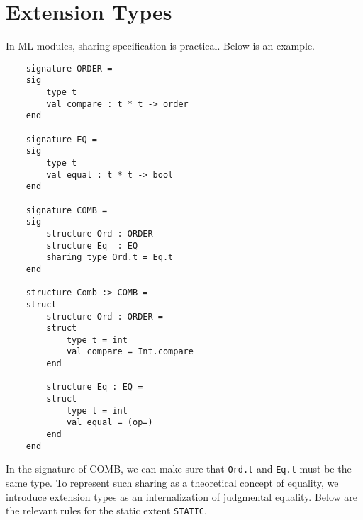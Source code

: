 \documentclass[11pt]{article}
\begin{document}
\section*{Extension Types}
In ML modules, sharing specification is practical. Below is an example.
\begin{verbatim}
    signature ORDER =
    sig
        type t
        val compare : t * t -> order
    end

    signature EQ =
    sig
        type t
        val equal : t * t -> bool
    end

    signature COMB =
    sig
        structure Ord : ORDER
        structure Eq  : EQ
        sharing type Ord.t = Eq.t
    end

    structure Comb :> COMB =
    struct
        structure Ord : ORDER =
        struct
            type t = int
            val compare = Int.compare
        end

        structure Eq : EQ =
        struct
            type t = int
            val equal = (op=)
        end
    end
\end{verbatim} 
In the signature of COMB, we can make sure that \texttt{Ord.t} and \texttt{Eq.t} must be the same type. 
To represent such sharing as a theoretical concept of equality, we introduce extension types as an internalization of judgmental equality.
Below are the relevant rules for the static extent \texttt{STATIC}.
\begin{rules}
    \\
    \\
    \qquad
    \\
    \qquad

\end{rules}
\end{document}
